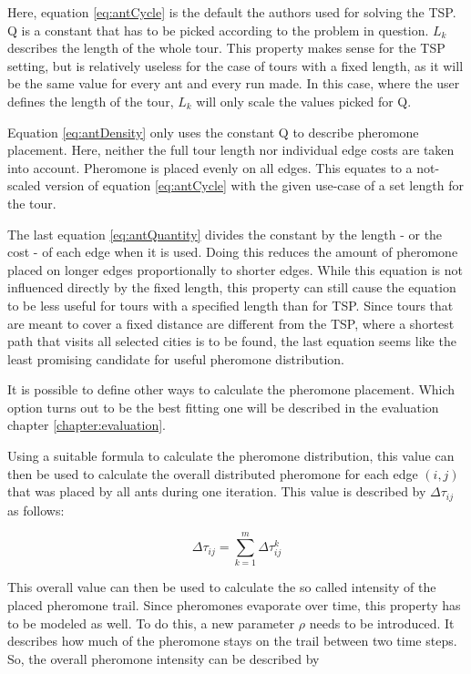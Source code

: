 Here, equation \ref{eq:antCycle} is the default the authors used for solving the TSP.
Q is a constant that has to be picked according to the problem in question.
$L_k$ describes the length of the whole tour.
This property makes sense for the TSP setting, but is relatively useless for the case of tours with a fixed length, as it will be the same value for every ant and every run made.
In this case, where the user defines the length of the tour, $L_k$ will only scale the values picked for Q\cite{dorigo_ant_1996}.

Equation \ref{eq:antDensity} only uses the constant Q to describe pheromone placement. 
Here, neither the full tour length nor individual edge costs are taken into account. 
Pheromone is placed evenly on all edges.
This equates to a not-scaled version of equation \ref{eq:antCycle} with the given use-case of a set length for the tour\cite{dorigo_ant_1996}.

The last equation \ref{eq:antQuantity} divides the constant by the length - or the cost - of each edge when it is used. 
Doing this reduces the amount of pheromone placed on longer edges proportionally to shorter edges. 
While this equation is not influenced directly by the fixed length, this property can still cause the equation to be less useful for tours with a specified length than for TSP.
Since tours that are meant to cover a fixed distance are different from the TSP, where a shortest path that visits all selected cities is to be found, the last equation seems like the least promising candidate for useful pheromone distribution\cite{dorigo_ant_1996}.

It is possible to define other ways to calculate the pheromone placement. 
Which option turns out to be the best fitting one will be described in the evaluation chapter \ref{chapter:evaluation}.


Using a suitable formula to calculate the pheromone distribution, this value can then be used to calculate the overall distributed pheromone for each edge $(i,j)$ that was placed by all ants during one iteration.
This value is described by $\Delta\tau_{ij}$ as follows\cite{dorigo_ant_1996}:

\begin{equation}\label{eq:deltaTau}
	\Delta\tau_{ij} = \sum_{k=1}^{m} \Delta\tau_{ij}^k 
\end{equation}

This overall value can then be used to calculate the so called \glqq intensity\grqq{} of the placed pheromone trail.
Since pheromones evaporate over time, this property has to be modeled as well. 
To do this, a new parameter $\rho$ needs to be introduced. It describes how much of the pheromone stays on the trail between two time steps.
So, the overall pheromone intensity can be described by


